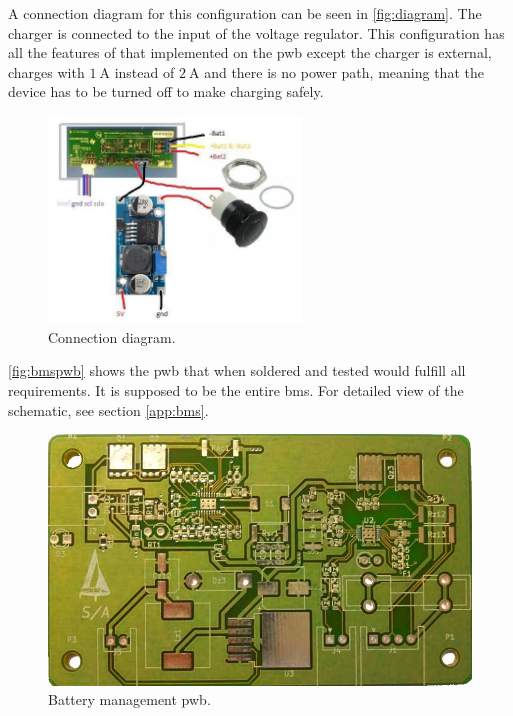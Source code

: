 A connection diagram for this configuration can be seen in \autoref{fig:diagram}. The charger is connected to the input of the voltage regulator. This configuration has all the features of that implemented on the \gls{pwb} except the charger is external, charges with $1~\textrm{A}$ instead of $2~\textrm{A}$ and there is no power path, meaning that the device has to be turned off to make charging safely.
\begin{figure}[H]
	\centering
	\includegraphics[width=0.6\textwidth]{Figures/diagram.jpg}
	\caption{Connection diagram.}
	\label{fig:diagram}
\end{figure} 

\autoref{fig:bmspwb} shows the \gls{pwb} that when soldered and tested would fulfill all requirements. It is supposed to be the entire \gls{bms}. For detailed view of the schematic, see section \ref{app:bms}.
\begin{figure}[H]
	\centering
	\includegraphics[width=.6\textwidth]{Figures/bmspwb.jpg}
	\caption{Battery management \gls{pwb}.}
	\label{fig:bmspwb}
\end{figure}
